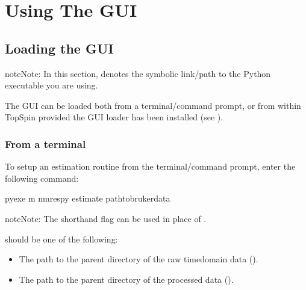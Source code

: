 \documentclass[letterpaper,10pt,english]{sphinxmanual}
\begin{document}
\section{Using The GUI}
\label{\detokenize{gui/usage/index:using-the-gui}}\label{\detokenize{gui/usage/index::doc}}



\subsection{Loading the GUI}
\label{\detokenize{gui/usage/loading:loading-the-gui}}\label{\detokenize{gui/usage/loading::doc}}
\begin{sphinxadmonition}{note}{Note:}
\sphinxAtStartPar
In this section,  denotes the symbolic link/path to the Python
executable you are using.
\end{sphinxadmonition}

\sphinxAtStartPar
The GUI can be loaded both from a terminal/command prompt, or from within
TopSpin provided the GUI loader has been installed
(see {\hyperref[\detokenize{gui/topspin_install::doc}]{}}).


\subsubsection{From a terminal}
\label{\detokenize{gui/usage/loading:from-a-terminal}}
\sphinxAtStartPar
To set\sphinxhyphen{}up an estimation routine from the terminal/command prompt,
enter the following command:

\begin{sphinxVerbatim}[commandchars=\\\{\}]
\PYGZdl{} \PYGZlt{}pyexe\PYGZgt{} \PYGZhy{}m nmrespy \PYGZhy{}\PYGZhy{}estimate \PYGZlt{}path\PYGZus{}to\PYGZus{}bruker\PYGZus{}data\PYGZgt{}
\end{sphinxVerbatim}

\begin{sphinxadmonition}{note}{Note:}
\sphinxAtStartPar
The shorthand flag  can be used in place of .
\end{sphinxadmonition}

\sphinxAtStartPar
{} should be one of the following:
\begin{itemize}
\item {} 
\sphinxAtStartPar
The path to the parent directory of the raw time\sphinxhyphen{}domain data ().

\item {} 
\sphinxAtStartPar
The path to the parent directory of the processed data ().

\end{itemize}
\end{document}
